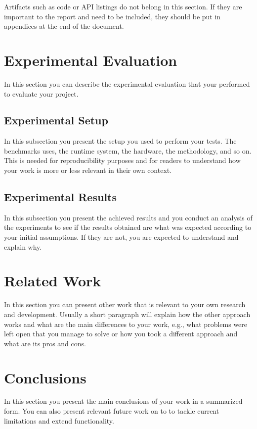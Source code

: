 \documentclass[sigconf,balance,nonacm,authordraft]{acmart}
\begin{document}
Artifacts such as code or API listings do not belong in this section. If they are important to the report and need to be included, they should be put in appendices at the end of the document.

\section{Experimental Evaluation}
\label{sec:evaluation}
In this section you can describe the experimental evaluation that your performed to evaluate your project.

\subsection{Experimental Setup}
In this subsection you present the setup you used to perform your tests. The benchmarks uses, the runtime system, the hardware, the methodology, and so on. This is needed for reproducibility purposes and for readers to understand how your work is more or less relevant in their own context.

\subsection{Experimental Results}
In this subsection you present the achieved results and you conduct an analysis of the experiments to see if the results obtained are what was expected according to your initial assumptions. If they are not, you are expected to understand and explain why.

\section{Related Work}
\label{sec:rel}
In this section you can present other work that is relevant to your own research and development. Usually a short paragraph will explain how the other approach works and what are the main differences to your work, e.g., what problems were left open that you manage to solve or how you took a different approach and what are its pros and cons.

\section{Conclusions}
\label{sec:conclusions}
In this section you present the main conclusions of your work in a summarized form. You can also present relevant future work on to to tackle current limitations and extend functionality.
\end{document}
